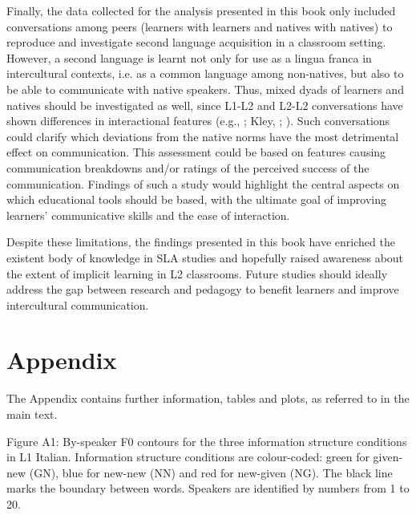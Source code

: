 \begin{stylecaption}
\textup{Finally, the data collected for the analysis presented in this book only included conversations among peers (learners with learners and natives with natives) to reproduce and investigate second language acquisition in a classroom setting. However, a second language is learnt not only for use as a lingua franca in intercultural contexts, i.e. as a common language among non-natives, but also to be able to communicate with native speakers.} \textup{Thus, mixed dyads of learners and natives should be investigated as well, since L1-L2 and L2-L2 conversations have shown differences in interactional features} \textup{(e.g., \citealt{Shibata2023}; Kley, \citealt{KunitzYeh2023}; \citealt{JungCrossley2024})}. \textup{Such conversations could clarify which deviations from the native norms have the most detrimental effect on communication. This assessment could be based on features causing communication breakdowns and/or ratings of the perceived success of the communication. Findings of such a study would highlight the central aspects on which educational tools should be based, with the ultimate goal of improving learners’ communicative skills and the ease of interaction.}
\end{stylecaption}

\begin{stylecaption}
\textup{Despite these limitations, the findings presented in this book have enriched the existent body of knowledge in SLA studies and hopefully raised awareness about the extent of implicit learning in L2 classrooms. Future studies should ideally address the gap between research and pedagogy to benefit learners and improve intercultural communication.}
\end{stylecaption}

\section{Appendix}
\hypertarget{Toc191305967}{}
The Appendix contains further information, tables and plots, as referred to in the main text.

  
 

\begin{stylecaption}
Figure A1: By-speaker F0 contours for the three information structure conditions in L1 Italian. Information structure conditions are colour-coded: green for given-new (GN), blue for new-new (NN) and red for new-given (NG). The black line marks the boundary between words. Speakers are identified by numbers from 1 to 20.
\end{stylecaption}

